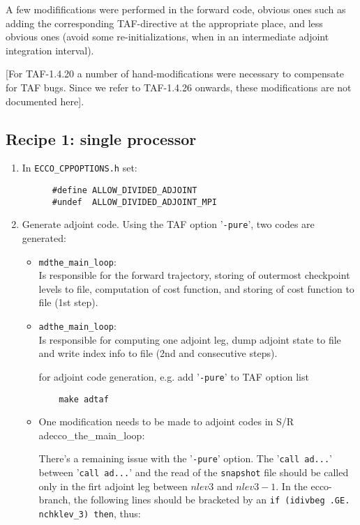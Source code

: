 A few modififications were performed in the forward code,
obvious ones such as adding the corresponding TAF-directive
at the appropriate place, and less obvious ones
(avoid some re-initializations, when in an intermediate
adjoint integration interval).

[For TAF-1.4.20 a number of hand-modifications were necessary
to compensate for TAF bugs.
Since we refer to TAF-1.4.26 onwards,
these modifications are not documented here].

\subsection{Recipe 1: single processor}


\begin{enumerate}

\item
In {\tt ECCO\_CPPOPTIONS.h} set:
%
{\footnotesize
\begin{verbatim}
      #define ALLOW_DIVIDED_ADJOINT
      #undef  ALLOW_DIVIDED_ADJOINT_MPI
\end{verbatim}
}

\item
Generate adjoint code. 
Using the TAF option '{\tt -pure}', two codes are generated:
%
\begin{itemize}
%
\item {\tt mdthe\_main\_loop}: \\
Is responsible for the forward trajectory, storing of outermost
checkpoint levels to file, computation of cost function, and
storing of cost function to file (1st step).
%
\item {\tt adthe\_main\_loop}: \\
Is responsible for computing one adjoint leg, dump adjoint state
to file and write index info to file (2nd and consecutive steps).

    for adjoint code generation, e.g. add '{\tt -pure}' to
    TAF option list
{\footnotesize
\begin{verbatim}
    make adtaf
\end{verbatim}
}
%

\item
One modification needs to be made to adjoint codes in
S/R adecco\_the\_main\_loop:

There's a remaining issue with the '{\tt -pure}' option.
The '{\tt call ad...}' 
between '{\tt call ad...}' and the read of the {\tt snapshot} file
should be called only in the firt adjoint leg between
$nlev3$ and $nlev3-1$.
In the ecco-branch, the following lines should be 
bracketed by an {\tt if (idivbeg .GE. nchklev\_3) then}, thus:


\end{itemize}
\end{enumerate}
